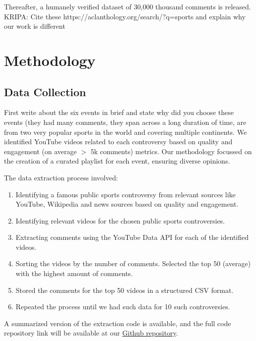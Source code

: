 \documentclass[sigconf, review]{acmart}
\begin{document}
Thereafter, a humanely verified dataset of 30,000 thousand comments is released. %
{\color{red}KRIPA: Cite these https://aclanthology.org/search/?q=sports and explain why our work is different}

\section{Methodology}



\subsection{Data Collection}
{\color{red} First write about the six events in brief and state why did you choose these events (they had many comments, they span across a long duration of time, are from two very popular sports in the world and covering multiple continents.}
We identified YouTube videos related to each controversy based on quality and engagement (on average $>$ 5k comments) metrics. Our methodology focussed on the creation of a curated playlist for each event, ensuring diverse opinions.

The data extraction process involved:
\begin{enumerate}
    \item Identifying a famous public sports controversy from relevant sources like YouTube, Wikipedia and news sources based on quality and engagement.
    \item Identifying relevant videos for the chosen public sports controversies.
    \item Extracting comments using the YouTube Data API for each of the identified videos.
    \item Sorting the videos by the number of comments. Selected the top 50 (average) with the highest amount of comments.
    \item Stored the comments for the top 50 videos in a structured CSV format.
    \item Repeated the process until we had such data for 10 such controversies.
\end{enumerate}

A summarized version of the extraction code is available, and the full code repository link will be available at our \href{https://github.com/YuvrajSingh-mist/Public-Sports-Controversy/tree/master}{Github repository}.
\end{document}
